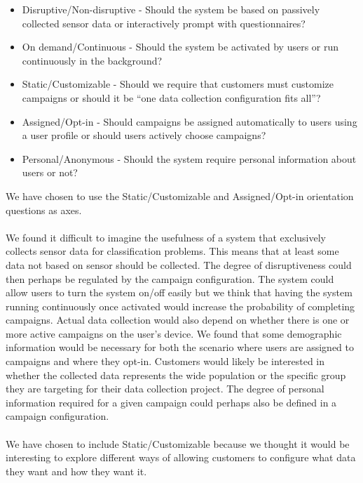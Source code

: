 \begin{itemize}[itemsep=0.1em]
	\item Disruptive/Non-disruptive - Should the system be based on passively collected sensor data or interactively prompt with questionnaires? %
	\item On demand/Continuous - Should the system be activated by users or run continuously in the background? %
	\item Static/Customizable - Should we require that customers must customize campaigns or should it be ``one data collection configuration fits all''? %
	\item Assigned/Opt-in - Should campaigns be assigned automatically to users using a user profile or should users actively choose campaigns? %
	\item Personal/Anonymous - Should the system require personal information about users or not? %
\end{itemize}

We have chosen to use the Static/Customizable and Assigned/Opt-in orientation questions as axes. 
\\\\
We found it difficult to imagine the usefulness of a system that exclusively collects sensor data for classification problems. This means that at least some data not based on sensor should be collected. The degree of disruptiveness could then perhaps be regulated by the campaign configuration. 
The system could allow users to turn the system on/off easily but we think that having the system running continuously once activated would increase the probability of completing campaigns. Actual data collection would also depend on whether there is one or more active campaigns on the user's device.
We found that some demographic information would be necessary for both the scenario where users are assigned to campaigns and where they opt-in. Customers would likely be interested in whether the collected data represents the wide population or the specific group they are targeting for their data collection project. The degree of personal information required for a given campaign could perhaps also be defined in a campaign configuration. 
\\\\
We have chosen to include Static/Customizable because we thought it would be interesting to explore different ways of allowing customers to configure what data they want and how they want it. %








